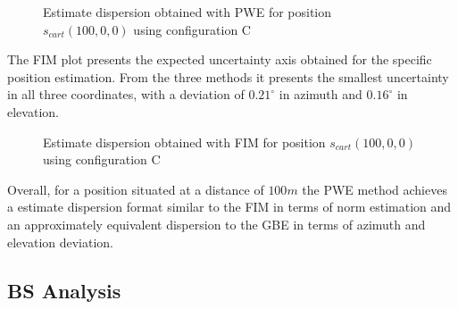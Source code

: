 \begin{figure}[!htbp]
	\captionsetup{justification=centering,margin=2cm}
	\caption{Estimate dispersion obtained with PWE for position $s_{cart}(100,0,0)$ using configuration C}
	\label{fig:SS-estimB-C-100,0,0}
\end{figure}

The FIM plot presents the expected uncertainty axis obtained for the specific position estimation. From the three methods it presents the smallest uncertainty in all three coordinates, with a deviation of $0.21^{\circ}$ in azimuth and $0.16^{\circ}$ in elevation.


\begin{figure}[!htbp]
	\captionsetup{justification=centering,margin=2cm}
	\caption{Estimate dispersion obtained with FIM for position $s_{cart}(100,0,0)$ using configuration C}
	\label{fig:SS-fim-C-100,0,0}
\end{figure}

Overall, for a position situated at a distance of $100m$ the PWE method achieves a estimate dispersion format similar to the FIM in terms of norm estimation and an approximately equivalent dispersion to the GBE in terms of azimuth and elevation deviation.

\subsection{BS Analysis}


